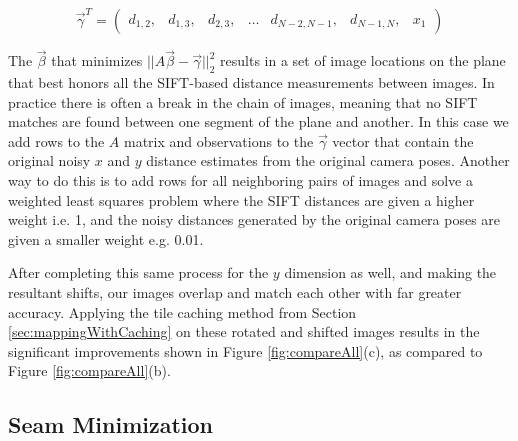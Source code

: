\documentclass[10pt,twocolumn,letterpaper]{article}
\begin{document}
\[
\vec{\gamma}^T =
\begin{pmatrix}
  d_{1,2}, &d_{1,3}, &d_{2,3}, &\hdots &d_{N-2,N-1}, &d_{N-1,N}, &x_1
\end{pmatrix}
\]

The $\vec{\beta}$ that minimizes $||A \vec{\beta} -
\vec{\gamma}||_2^2$ results in a set of image locations on the plane
that best honors all the SIFT-based distance measurements between
images. In practice there is often a break in the chain of images,
meaning that no SIFT matches are found between one segment of the
plane and another. In this case we add rows to the $A$ matrix and
observations to the $\vec{\gamma}$ vector that contain the original
noisy $x$ and $y$ distance estimates from the original camera
poses. Another way to do this is to add rows for all neighboring pairs
of images and solve a weighted least squares problem where the SIFT
distances are given a higher weight i.e. 1, and the noisy distances
generated by the original camera poses \cite{chen2010indoor,
  liu2010indoor} are given a smaller weight e.g. 0.01.

After completing this same process for the $y$ dimension as well, and
making the resultant shifts, our images overlap and match each other
with far greater accuracy. Applying the tile caching method from
Section \ref{sec:mappingWithCaching} on these rotated and shifted
images results in the significant improvements shown in Figure
\ref{fig:compareAll}(c), as compared to Figure
\ref{fig:compareAll}(b).


\subsection{Seam Minimization}
\label{sec:seamMinimization}
\end{document}

